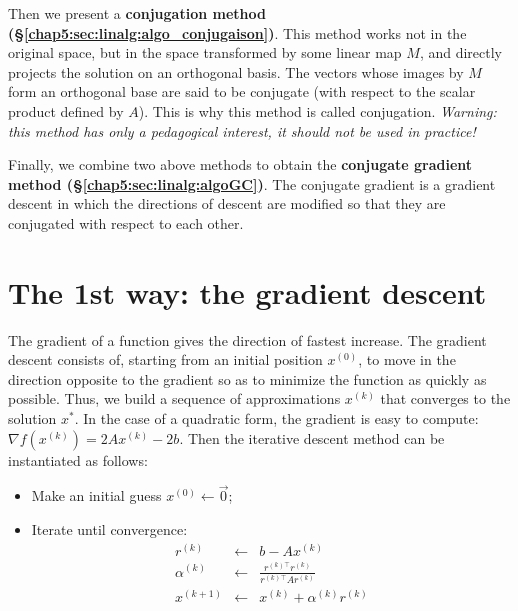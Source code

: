 \documentclass[notitlepage,oneside]{book}
\begin{document}
Then we present a \textbf{conjugation method (\S\ref{chap5:sec:linalg:algo_conjugaison})}.
This method works not in the original space, but in the space transformed by some linear map $M$, and directly projects the solution on an orthogonal basis.
The vectors whose images by $M$ form an orthogonal base are said to be conjugate (with respect to the scalar product defined by $A$).
This is why this method is called conjugation. \textit{Warning: this method has only a pedagogical interest, it should not be used in practice!}

Finally, we combine two above methods to obtain the \textbf{conjugate gradient method (\S\ref{chap5:sec:linalg:algoGC})}.
The conjugate gradient is a gradient descent in which the directions of descent are modified so that they are conjugated with respect to each other.

\newpage

\section{The 1st way: the gradient descent}
\label{chap5:sec:linalg:descente_gradient}

The gradient of a function gives the direction of fastest increase.
The gradient descent consists of, starting from an initial position $x^{(0)}$,
to move in the direction opposite to the gradient so as to minimize the function as quickly as possible.
Thus, we build a sequence of approximations $x^{(k)}$ that converges to the solution $x^*$.
In the case of a quadratic form, the gradient is easy to compute: $\nabla f(x^{(k)}) = 2Ax^{(k)} - 2b$.
Then the iterative descent method can be instantiated as follows:

\begin{framed}
\begin{itemize}
\setlength\parsep{0pt}
\setlength\itemsep{0pt}
\setlength{\parskip}{0pt}
\setlength{\topsep}{0pt}
\setlength{\partopsep}{0pt}
\item Make an initial guess $x^{(0)} \leftarrow \vec{0} $;
\item Iterate until convergence:
\begin{eqnarray*}
  r^{(k)} &\leftarrow& b -Ax^{(k)}\\
  \alpha^{(k)} &\leftarrow& \frac{r^{(k)\top}r^{(k)}}{r^{(k)\top}Ar^{(k)}}\\
  x^{(k+1)} &\leftarrow& x^{(k)}+\alpha^{(k)} r^{(k)}
\end{eqnarray*}
\end{itemize}
\end{framed}
\end{document}
